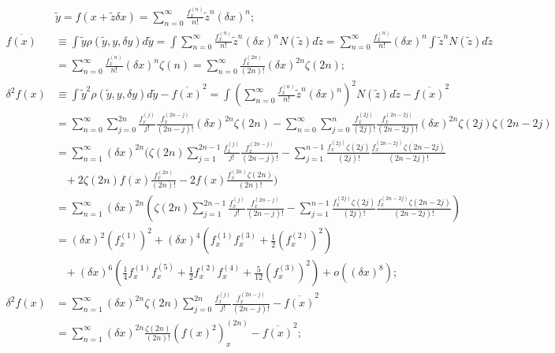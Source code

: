 \documentclass[twoside]{article}
\numberwithin{equation}{section}
\newcommand{\eqspace}{\;\;\;}
\begin{document}
\begin{align*}
& \tilde{y} = f(x + \tilde{z} \delta x) = \sum_{n=0}^{\infty} \frac{f^{(n)}_x}{n!} \tilde{z}^n (\delta x)^n; \\
\overline{f(x)} &\equiv \int \tilde{y} \rho(\tilde{y}, y, \delta y) d \tilde{y}
 = \int \sum_{n=0}^{\infty} \frac{f^{(n)}_x}{n!} \tilde{z}^n (\delta x)^n N(\tilde{z}) d \tilde{z}
 = \sum_{n=0}^{\infty} \frac{f^{(n)}_x}{n!} (\delta x)^{n} \int \tilde{z}^n N(\tilde{z}) d \tilde{z} \\
&= \sum_{n=0}^{\infty} \frac{f^{(n)}_x}{n!} (\delta x)^{n} \zeta(n)
 = \sum_{n=0}^{\infty} \frac{f^{(2n)}_x}{(2n)!} (\delta x)^{2n} \zeta(2n); \\
\delta^2 f(x) &\equiv \int \tilde{y}^2 \rho(\tilde{y}, y, \delta y) d \tilde{y} - \overline{f(x)}^2
 = \int (\sum_{n=0}^{\infty} \frac{f^{(n)}_x}{n!} \tilde{z}^n (\delta x)^n)^2 N(\tilde{z}) d \tilde{z} - \overline{f(x)}^2 \\
&= \sum_{n=0}^{\infty} \sum_{j=0}^{2n} \frac{f^{(j)}_x}{j!} \frac{f^{(2n-j)}_x}{(2n-j)!} (\delta x)^{2n} \zeta(2n)
 - \sum_{n=0}^{\infty} \sum_{j=0}^{n} \frac{f^{(2j)}_x}{(2j)!} \frac{f^{(2n-2j)}_x}{(2n-2j)!} (\delta x)^{2n} \zeta(2j) \zeta(2n - 2j) \\
&= \sum_{n=1}^{\infty} (\delta x)^{2n} ( \zeta(2n) \sum_{j=1}^{2n-1} \frac{f^{(j)}_x}{j!} \frac{f^{(2n-j)}_x}{(2n-j)!}
  - \sum_{j=1}^{n-1} \frac{f^{(2j)}_x \zeta(2j)}{(2j)!} \frac{f^{(2n-2j)}_x \zeta(2n - 2j)}{(2n-2j)!} \\
&\eqspace + 2 \zeta(2n) f(x) \frac{f^{(2n)}_x}{(2n)!} - 2 f(x) \frac{f^{(2n)}_x \zeta(2n)}{(2n)!}) \\
&= \sum_{n=1}^{\infty} (\delta x)^{2n} \left( \zeta(2n) \sum_{j=1}^{2n-1} \frac{f^{(j)}_x}{j!} \frac{f^{(2n-j)}_x}{(2n-j)!}
  - \sum_{j=1}^{n-1} \frac{f^{(2j)}_x \zeta(2j)}{(2j)!} \frac{f^{(2n-2j)}_x \zeta(2n - 2j)}{(2n-2j)!} \right) \\
&= (\delta x)^2 (f^{(1)}_x)^2 + (\delta x)^4 \left(f^{(1)}_x f^{(3)}_x + \frac{1}{2} (f^{(2)}_x)^2 \right) \\
&\eqspace + (\delta x)^6 \left(\frac{1}{4} f^{(1)}_x f^{(5)}_x + \frac{1}{2} f^{(2)}_x f^{(4)}_x + \frac{5}{12} (f^{(3)}_x)^2 \right) + o((\delta x)^8); \\
\delta^2 f(x) &= \sum_{n=1}^{\infty} (\delta x)^{2n} \zeta(2n) \sum_{j=0}^{2n} \frac{f^{(j)}_x}{j!} \frac{f^{(2n-j)}_x}{(2n-j)!} - \overline{f(x)}^2 \\
  &= \sum_{n=1}^{\infty} (\delta x)^{2n} \frac{\zeta(2n)}{(2n)!} (f(x)^2)^{(2n)}_x - \overline{f(x)}^2; \\

\end{align*}
\end{document}
